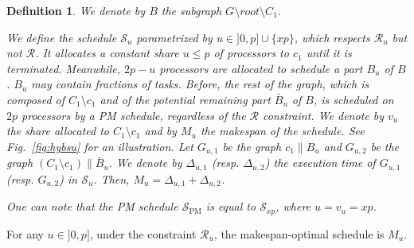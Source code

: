 \documentclass{llncs}
\newtheorem{defi}[theorem]{Definition}
\newcommand{\para}[2]{#1 \mathop{\parallel} #2}
\newcommand{\s}{\mathcal S\xspace}
\newcommand{\spm}{\ensuremath{\mathcal{S}_{\mathrm{PM}}}\xspace}
\newcommand{\R}{\ensuremath{\mathcal{R}}\xspace}
\begin{document}
\begin{defi}
\label{def:su}
We denote by $B$ the subgraph $G\setminus \mathit{root} \setminus C_1$.

We define the schedule $\s_u$ parametrized by $u\in]0,p]\cup\{xp\}$,
which respects $\R_u$ but not $\R$. It allocates a constant share
$u\leq p$ of processors to $c_1$ until it is terminated. Meanwhile,
$2p-u$ processors are allocated to schedule a part $B_u$ of $B$. $B_u$
may contain fractions of tasks. Before, the rest of the graph, which
is composed of $C_1\setminus c_1$ and of the potential remaining part
$\bar B_u$ of $B$, is scheduled on $2p$ processors by a PM schedule,
regardless of the $\R$ constraint. We denote by $v_u$ the share
allocated to $C_1\setminus c_1$ and by $M_u$ the makespan of the
schedule. See Fig.~\ref{fig:hybsu} for an illustration. 
Let $G_{u,1}$ be the graph $\para{c_1}{B_{u}}$ and $G_{u,2}$ be the graph $\para{\left(C_1\setminus c_1\right)}{\bar B_u}$.
We denote by $\Delta_{u,1}$  (resp. $\Delta_{u,2}$) the execution time of $G_{u,1}$ (resp. $G_{u,2}$) in $\s_u$. Then, $M_u=\Delta_{u,1}+\Delta_{u,2}$.

One can note that the PM schedule $\spm$ is equal to $\s_{xp}$, where $u=v_u=xp$.



\end{defi}
 
 
 
\begin{lemma}
\label{lem:muopt}
For any $u\in]0,p]$, under the constraint $\R_u$, the makespan-optimal schedule is $M_u$.
\end{lemma} 
 
\end{document}
